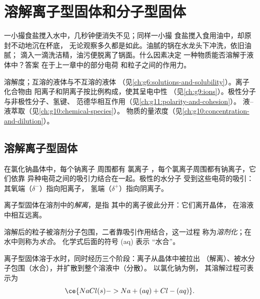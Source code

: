 \chapter{溶解离子型固体和分子型固体}\label{ch:g11:dissolution}

一小撮食盐搅入水中，几秒钟便消失不见；同样一小撮
食盐搅入食用油中，却原封不动地沉在杯底，
无论观察多久都是如此。油腻的锅在水龙头下冲洗，依旧油腻；
滴入一滴洗洁精，油污便脱离了锅面。什么因素决定
一种物质能否溶解于液体中？答案
在于上一章中的部分电荷
和粒子之间的作用力。

\begin{recall}
溶解度；互溶的液体与不互溶的液体
（见\cref{ch:g6:solutions-and-solubility}）。离子化合物由
阳离子和阴离子按比例构成，使其呈电中性
（见\cref{ch:g9:ions}）。极性分子与非极性分子、氢键、
范德华相互作用（见\cref{ch:g11:polarity-and-cohesion}）。
液–液萃取（见\cref{ch:g10:chemical-species}）。
物质的量浓度（见\cref{ch:g10:concentration-and-dilution}）。
\end{recall}

\section{溶解离子型固体}

在氯化钠晶体中，每个钠离子  周围都有
氯离子 ，每个氯离子周围都有钠离子，它们依靠
异种电荷之间的吸引力结合在一起。极性的水分子
受到这些电荷的吸引：其氧端（$\delta^-$）指向阳离子，
氢端（$\delta^+$）指向阴离子。

\begin{definition}[解离]\label{def:g11:dissolution:dissociation}
离子型固体在溶剂中的\emph{解离}，是指
其中的离子彼此分开：它们离开晶体，
在溶液中相互远离。
\end{definition}

\begin{definition}[溶剂化、水合]\label{def:g11:dissolution:solvation}
溶解后的粒子被溶剂分子包围，二者靠吸引作用结合，这一过程
称为\emph{溶剂化}；在水中则称为\emph{水合}。
化学式后面的符号 (aq) 表示
“水合”。
\end{definition}

\begin{proposition}[溶解的三个阶段]\label{prop:g11:dissolution:stages}
离子型固体溶于水时，同时经历三个阶段：离子从晶体中被拉出
（解离）、被水分子包围（水合），并扩散到整个溶液中（分散）。
以氯化钠为例，
其溶解过程可表示为
\[
  \ce{NaCl(s) -> Na+(aq) + Cl-(aq)} .
\]
\end{proposition}

